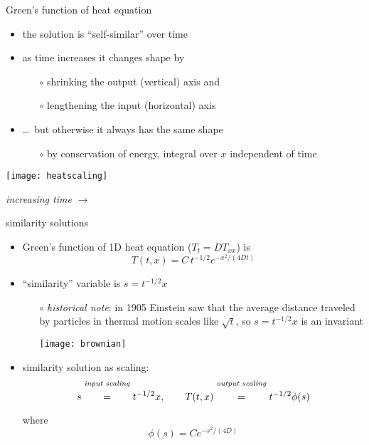 \begin{frame}{Green's function of heat equation}

\begin{itemize}
\item the solution is ``self-similar'' over time
\item as time increases it changes shape by
  \begin{itemize}
  \item[$\circ$] shrinking the output (vertical) axis and
  \item[$\circ$] lengthening the input (horizontal) axis
  \end{itemize}
\item \dots\, but otherwise it always has the same shape
  \begin{itemize}
  \item[$\circ$] by conservation of energy, integral over $x$ independent of time
  \end{itemize}
\end{itemize}

\begin{center}
\texttt{[image: heatscaling]}

\emph{increasing time} \Large $\to$
\end{center}
\end{frame}


\begin{frame}{similarity solutions}

\begin{itemize}
\item Green's function of 1D heat equation ($T_t = D T_{xx}$) is
	$$T(t,x) = C\, t^{-1/2} e^{-x^2/(4Dt)}$$
\item ``similarity'' variable is $s = t^{-1/2} x$
  \begin{itemize}
  \item[$\circ$] \emph{historical note}:  in 1905 Einstein saw that the average distance traveled by particles in thermal motion scales like $\sqrt{t}$, so $s = t^{-1/2} x$ is an invariant

  \vspace{-2mm}
  \hfill\texttt{[image: brownian]}
  \end{itemize}
\item similarity solution as scaling:
	$$s \stackrel{\text{\emph{input scaling}}}{\phantom{\Big|}=\phantom{\Big|}} t^{-1/2} x, \qquad T(t,x) \stackrel{\text{\emph{output scaling}}}{\phantom{\Big|}=\phantom{\Big|}} t^{-1/2} \phi(s)$$
where
    $$\phi(s) = C e^{-s^2/(4D)}$$
\end{itemize}

\end{frame}


